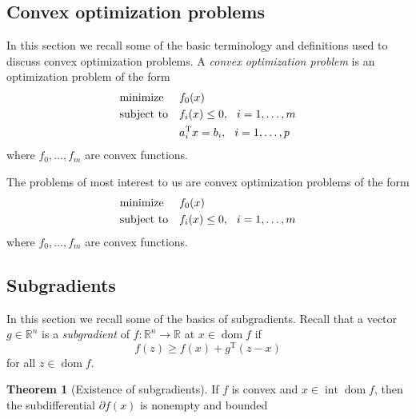 \documentclass[11pt]{amsart}
\theoremstyle{definition}
\newtheorem{theorem}{Theorem}[section]
\theoremstyle{remark}
\newcommand{\gap}{\hspace*{0.25cm}}
\newcommand{\transpose}{\text{T}}
\DeclareMathOperator{\interior}{int}
\DeclareMathOperator{\domain}{dom}
\begin{document}
   \subsection{Convex optimization problems}
        In this section we recall some of the basic terminology and definitions used to discuss convex optimization problems. A \emph{convex optimization problem} is an optimization problem of the form 
        \begin{equation}\label{e:convex_opt_problem}
            \begin{aligned}
            & {\text{minimize}} && f_0(x) \\
            & \text{subject to} && f_i(x) \leq 0, \gap i = 1, \dots, m \\
            &                   && a_i^\transpose x = b_i, \gap i = 1, \dots, p
            \end{aligned}
        \end{equation}
        where $f_0, \dots, f_m$ are convex functions. 

        The problems of most interest to us are convex optimization problems of the form  
        \begin{equation}\label{e:convex_opt_problem_of_interest}
            \begin{aligned}
            & {\text{minimize}} && f_0(x) \\
            & \text{subject to} && f_i(x) \leq 0, \gap i = 1, \dots, m
            \end{aligned}
        \end{equation}
        where $f_0, \dots, f_m$ are convex functions. 

    \subsection{Subgradients}
        In this section we recall some of the basics of subgradients. Recall that a vector $g \in \mathbb{R}^n$ is a \emph{subgradient} of $f: \mathbb{R}^n \to \mathbb{R}$ at $x \in \domain f$ if 
        \begin{equation}\label{d:subgrad}
            f(z) \geq f(x) + g^\transpose(z-x)
        \end{equation}
        for all $z \in \domain f$.

        \begin{theorem}[Existence of subgradients]\label{t:existence_of_subgrads}
            If $f$ is convex and $x \in \interior \domain f$, then the subdifferential $\partial f(x)$ is nonempty and bounded 
        \end{theorem}
\end{document}
